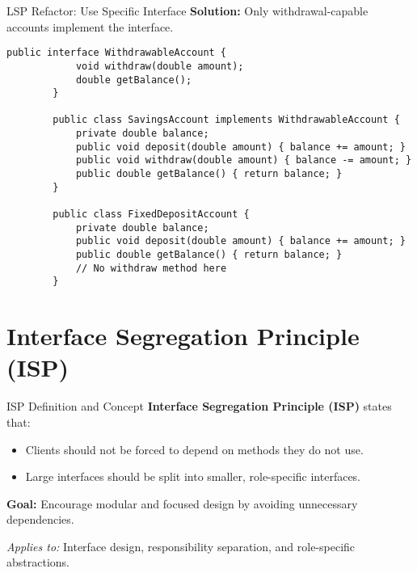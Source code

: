 \documentclass[aspectratio=169, table]{beamer}
\begin{document}
\begin{frame}[fragile]{LSP Refactor: Use Specific Interface}
	\vspace{20pt}
	\textbf{Solution:} Only withdrawal-capable accounts implement the interface.
	
	\begin{lstlisting}[style=JavaStyle]
		public interface WithdrawableAccount {
			void withdraw(double amount);
			double getBalance();
		}
		
		public class SavingsAccount implements WithdrawableAccount {
			private double balance;
			public void deposit(double amount) { balance += amount; }
			public void withdraw(double amount) { balance -= amount; }
			public double getBalance() { return balance; }
		}
		
		public class FixedDepositAccount {
			private double balance;
			public void deposit(double amount) { balance += amount; }
			public double getBalance() { return balance; }
			// No withdraw method here
		}
	\end{lstlisting}
\end{frame}

\section{Interface Segregation Principle (ISP)}

\begin{frame}[fragile]{ISP Definition and Concept}
	\vspace{20pt}
	\textbf{Interface Segregation Principle (ISP)} states that:
	\begin{itemize}
		\item Clients should not be forced to depend on methods they do not use.
		\item Large interfaces should be split into smaller, role-specific interfaces.
	\end{itemize}
	
	\textbf{Goal:} Encourage modular and focused design by avoiding unnecessary dependencies.
	
	\textit{Applies to:} Interface design, responsibility separation, and role-specific abstractions.
\end{frame}
\end{document}
